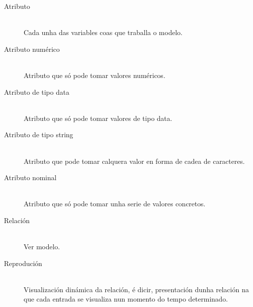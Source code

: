 \begin{description}
	\item[Atributo] \hfill \\
  Cada unha das variables coas que traballa o modelo.
	\item[Atributo numérico] \hfill \\
  Atributo que só pode tomar valores numéricos.
	\item[Atributo de tipo data] \hfill \\
  Atributo que só pode tomar valores de tipo data.
	\item[Atributo de tipo string] \hfill \\
  Atributo que pode tomar calquera valor en forma de cadea de caracteres.
	\item[Atributo nominal] \hfill \\
  Atributo que só pode tomar unha serie de valores concretos.
	\item[Relación] \hfill \\
 Ver modelo.
\item[Reprodución] \hfill \\
 Visualización dinámica da relación, é dicir, presentación dunha relación na que cada entrada se visualiza nun momento do tempo determinado.
\end{description}